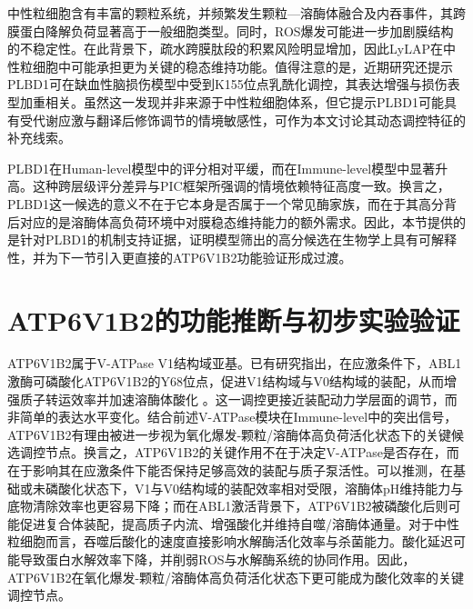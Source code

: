 中性粒细胞含有丰富的颗粒系统，并频繁发生颗粒—溶酶体融合及内吞事件，其跨膜蛋白降解负荷显著高于一般细胞类型。同时，ROS爆发可能进一步加剧膜结构的不稳定性。在此背景下，疏水跨膜肽段的积累风险明显增加，因此LyLAP在中性粒细胞中可能承担更为关键的稳态维持功能。值得注意的是，近期研究还提示PLBD1可在缺血性脑损伤模型中受到K155位点乳酰化调控，其表达增强与损伤表型加重相关\cite{zhou2025lactylation}。虽然这一发现并非来源于中性粒细胞体系，但它提示PLBD1可能具有受代谢应激与翻译后修饰调节的情境敏感性，可作为本文讨论其动态调控特征的补充线索。

PLBD1在Human-level模型中的评分相对平缓，而在Immune-level模型中显著升高。这种跨层级评分差异与PIC框架所强调的情境依赖特征高度一致。换言之，PLBD1这一候选的意义不在于它本身是否属于一个常见酶家族，而在于其高分背后对应的是溶酶体高负荷环境中对膜稳态维持能力的额外需求。因此，本节提供的是针对PLBD1的机制支持证据，证明模型筛出的高分候选在生物学上具有可解释性，并为下一节引入更直接的ATP6V1B2功能验证形成过渡。

\section{ATP6V1B2的功能推断与初步实验验证}

ATP6V1B2属于V-ATPase V1结构域亚基。已有研究指出，在应激条件下，ABL1激酶可磷酸化ATP6V1B2的Y68位点，促进V1结构域与V0结构域的装配，从而增强质子转运效率并加速溶酶体酸化 \cite{song2025nonreceptor}。这一调控更接近装配动力学层面的调节，而非简单的表达水平变化。结合前述V-ATPase模块在Immune-level中的突出信号，ATP6V1B2有理由被进一步视为氧化爆发-颗粒/溶酶体高负荷活化状态下的关键候选调控节点。换言之，ATP6V1B2的关键作用不在于决定V-ATPase是否存在，而在于影响其在应激条件下能否保持足够高效的装配与质子泵活性。可以推测，在基础或未磷酸化状态下，V1与V0结构域的装配效率相对受限，溶酶体pH维持能力与底物清除效率也更容易下降；而在ABL1激活背景下，ATP6V1B2被磷酸化后则可能促进复合体装配，提高质子内流、增强酸化并维持自噬/溶酶体通量。对于中性粒细胞而言，吞噬后酸化的速度直接影响水解酶活化效率与杀菌能力。酸化延迟可能导致蛋白水解效率下降，并削弱ROS与水解酶系统的协同作用。因此，ATP6V1B2在氧化爆发-颗粒/溶酶体高负荷活化状态下更可能成为酸化效率的关键调控节点。

